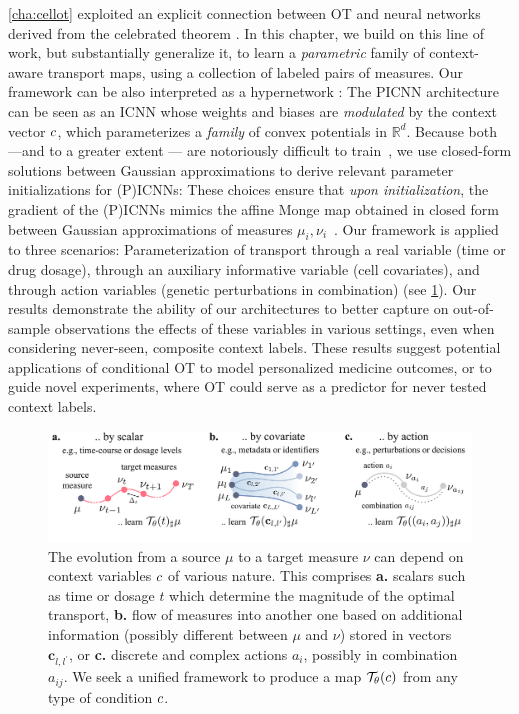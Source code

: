  \cref{cha:cellot} exploited an explicit connection between OT and neural networks derived from the celebrated \citeauthor{brenier1987decomposition} theorem \citeyearpar{brenier1987decomposition}.
In this chapter, we build on this line of work, but substantially generalize it, to learn a {\em parametric} family of context-aware transport maps, using a collection of labeled pairs of measures.
Our framework can be also interpreted as a hypernetwork \citep{ha2016hypernetworks}: The \acrshort{PICNN} architecture can be seen as an \acrshort{ICNN} whose weights and biases are \textit{modulated} by the context vector $c$, which parameterizes a \textit{family} of convex potentials in $\mathbb{R}^d$.
%
Because both  ---and to a greater extent --- are notoriously difficult to train~\citep{richter2021input,korotin2021wasserstein,korotin2021neural}, we use closed-form solutions between Gaussian approximations to derive relevant parameter initializations for (P)ICNNs:
These choices ensure that \textit{upon initialization}, the gradient of the (P)ICNNs mimics the affine Monge map obtained in closed form between Gaussian approximations of measures $\mu_i,\nu_i$~\citep{gelbrich1990formula}.
%
Our framework is applied to three scenarios: Parameterization of transport through a real variable (time or drug dosage), through an auxiliary informative variable (cell covariates), and through action variables (genetic perturbations in combination) (see \cref{fig:overview_condot}). Our results demonstrate the ability of our architectures to better capture on out-of-sample observations the effects of these variables in various settings, even when considering never-seen, composite context labels. These results suggest potential applications of conditional OT to model personalized medicine outcomes, or to guide novel experiments, where OT could serve as a predictor for never tested context labels.


\begin{figure}
    \centering
    \includegraphics[width= \textwidth]{figures/fig_overview_condot.pdf}
    \caption{The evolution from a source $\mu$ to a target measure $\nu$ can depend on context variables $c$ of various nature. This comprises \textbf{a.} scalars such as time or dosage $t$ which determine the magnitude of the optimal transport, \textbf{b.} flow of measures into another one based on additional information (possibly different between $\mu$ and $\nu$) stored in vectors $\mathbf{c}_{l,l^\prime}$, or \textbf{c.} discrete and complex actions $a_i$, possibly in combination $a_{ij}$. We seek a unified framework to produce a map $\mathcal{T}_\theta(c)$ from any type of condition $c$. \vspace{-15pt}}
    \label{fig:overview_condot}
\end{figure}


